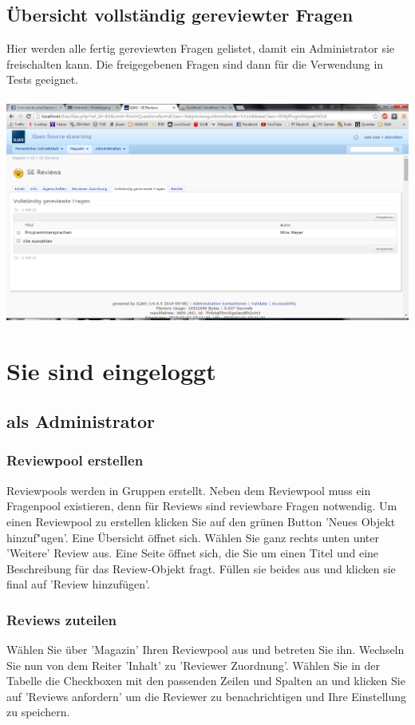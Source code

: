 \documentclass[12pt,a4paper]{scrreprt}
\begin{document}
\section{Übersicht vollständig gereviewter Fragen}
Hier werden alle fertig gereviewten Fragen gelistet, damit ein Administrator sie freischalten kann. Die freigegebenen Fragen sind dann für die Verwendung in Tests geeignet. \\
\\
\includegraphics[width=1.0\textwidth]{frage_fertigstellen.png}

\chapter{Sie sind eingeloggt}

\section{als Administrator}
	
\subsection{Reviewpool erstellen}
Reviewpools werden in Gruppen erstellt. Neben dem Reviewpool muss ein Fragenpool existieren, denn für Reviews sind reviewbare Fragen notwendig. Um einen Reviewpool zu erstellen klicken Sie auf den grünen Button 'Neues Objekt hinzuf"ugen'. Eine Übersicht öffnet sich. Wählen Sie ganz rechts unten unter 'Weitere' Review aus. Eine Seite öffnet sich, die Sie um einen Titel und eine Beschreibung für das Review-Objekt fragt. Füllen sie beides aus und klicken sie final auf 'Review hinzufügen'.
		
\subsection{Reviews zuteilen}
Wählen Sie über 'Magazin' Ihren Reviewpool aus und betreten Sie ihn. Wechseln Sie nun von dem Reiter 'Inhalt' zu 'Reviewer Zuordnung'. Wählen Sie in der Tabelle die Checkboxen mit den passenden Zeilen und Spalten an und klicken Sie auf 'Reviews anfordern' um die Reviewer zu benachrichtigen und Ihre Einstellung zu speichern.
		
\end{document}
